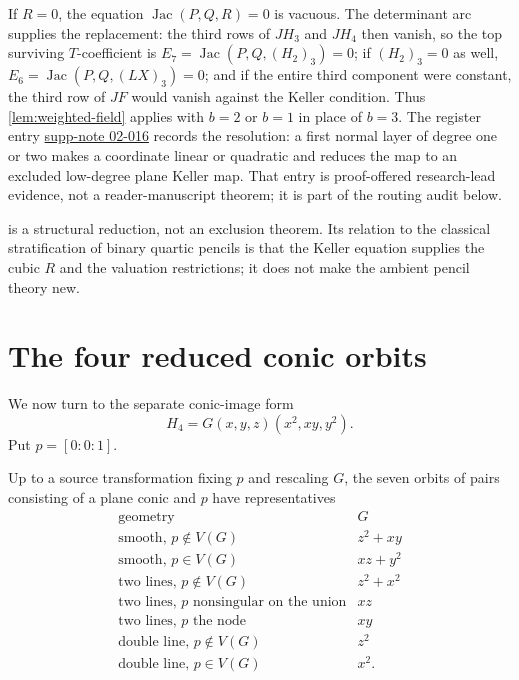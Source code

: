 \documentclass[11pt,reqno]{amsart}
\begin{document}
\begin{remark}
\label{rem:r-zero}
If \(R=0\), the equation \(\operatorname{Jac}(P,Q,R)=0\) is vacuous.
The determinant arc supplies the replacement: the third rows of
\(JH_3\) and \(JH_4\) then vanish, so the top surviving
\(T\)-coefficient is
\(E_7=\operatorname{Jac}(P,Q,(H_2)_3)=0\); if \((H_2)_3=0\) as well,
\(E_6=\operatorname{Jac}(P,Q,(LX)_3)=0\); and if the entire third
component were constant, the third row of \(JF\) would vanish against
the Keller condition.  Thus \cref{lem:weighted-field} applies with
\(b=2\) or \(b=1\) in place of \(b=3\).  The register entry
\hyperref[supp-note-02-016]{supp-note 02-016} records the resolution:
a first normal layer of degree one or two makes a coordinate linear or
quadratic and reduces the map to an excluded low-degree plane Keller
map.  That entry is proof-offered research-lead evidence, not a
reader-manuscript theorem; it is part of the routing audit below.
\end{remark}

\begin{remark}
 is a structural reduction, not an exclusion theorem.
Its relation to the classical stratification of binary quartic pencils
\cite{wall1998} is that the Keller equation supplies the cubic \(R\) and the
valuation restrictions; it does not make the ambient pencil theory new.
\end{remark}

\section{The four reduced conic orbits}
\label{sec:conic}

We now turn to the separate conic-image form
\begin{equation}
\label{eq:conic-form}
H_4=G(x,y,z)(x^2,xy,y^2).
\end{equation}
Put \(p=[0:0:1]\).

\begin{lemma}
\label{lem:orbits}
Up to a source transformation fixing \(p\) and rescaling \(G\), the seven
orbits of pairs consisting of a plane conic and \(p\) have representatives
\[
\begin{array}{c|c}
\text{geometry}&G\\ \hline
\text{smooth, }p\notin V(G)&z^2+xy\\
\text{smooth, }p\in V(G)&xz+y^2\\
\text{two lines, }p\notin V(G)&z^2+x^2\\
\text{two lines, }p\text{ nonsingular on the union}&xz\\
\text{two lines, }p\text{ the node}&xy\\
\text{double line, }p\notin V(G)&z^2\\
\text{double line, }p\in V(G)&x^2.
\end{array}
\]
\end{lemma}
\end{document}
